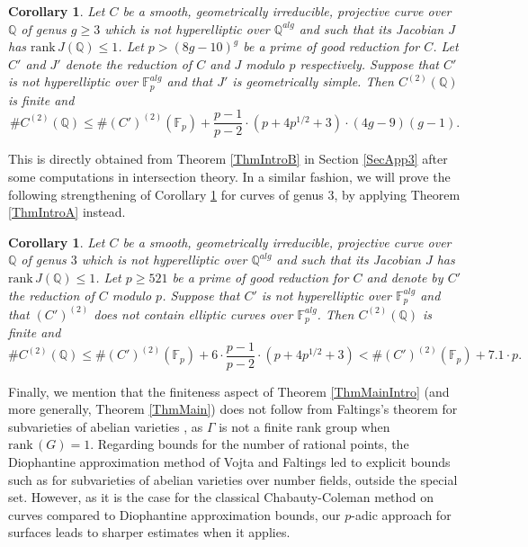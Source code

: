 \documentclass[11pt]{amsart}
\newtheorem{corollary}[theorem]{Corollary}
\theoremstyle{remark}
\numberwithin{equation}{section}
\newcommand{\F}{\mathbb{F}}
\newcommand{\Q}{\mathbb{Q}}
\newcommand{\rk}{\mathrm{rank}\,}
\begin{document}
\begin{corollary}\label{CoroQuadratic} Let $C$ be a smooth, geometrically irreducible, projective curve over $\Q$ of genus $g\ge 3$ which is not hyperelliptic over $\Q^{alg}$ and such that its Jacobian $J$ has $\rk J(\Q)\le 1$.  Let  $p>(8g-10)^g$ be a prime of good reduction for $C$. Let $C'$ and $J'$ denote the reduction of $C$ and $J$ modulo $p$ respectively. Suppose that $C'$ is not hyperelliptic over $\F_p^{alg}$ and that $J'$ is geometrically simple. Then  $C^{(2)}(\Q)$ is finite and
$$
\# C^{(2)}(\Q)\le \# (C')^{(2)}(\F_p) +  \frac{p-1}{p-2}\cdot \left(p+4p^{1/2} + 3\right)\cdot (4g-9)(g-1).
$$
\end{corollary}

This is directly obtained from Theorem \ref{ThmIntroB} in Section \ref{SecApp3} after some computations in intersection theory. In a similar fashion, we will prove the following strengthening of Corollary \ref{CoroQuadratic} for curves of genus $3$, by applying Theorem \ref{ThmIntroA} instead.

\begin{corollary}\label{CoroQuadratic3} Let $C$ be a smooth, geometrically irreducible, projective curve over $\Q$ of genus $3$ which is not hyperelliptic over $\Q^{alg}$ and such that its Jacobian $J$ has $\rk J(\Q)\le 1$.  Let  $p\ge 521$ be a prime of good reduction for $C$ and denote by $C'$ the reduction of $C$ modulo $p$. Suppose that $C'$ is not hyperelliptic over $\F_p^{alg}$ and that $(C')^{(2)}$ does not contain elliptic curves over $\F_p^{alg}$. Then  $C^{(2)}(\Q)$  is finite and
$$
\# C^{(2)}(\Q)\le \# (C')^{(2)}(\F_p) +  6\cdot \frac{p-1}{p-2}\cdot \left(p+4p^{1/2} + 3\right) <  \# (C')^{(2)}(\F_p) + 7.1\cdot p.
$$
\end{corollary}


Finally, we mention that the finiteness aspect of Theorem \ref{ThmMainIntro} (and more generally, Theorem \ref{ThmMain}) does not follow from Faltings's theorem for subvarieties of abelian varieties \cite{Faltings2}, as $\Gamma$ is not a finite rank group when $\rk(G)=1$.  Regarding bounds for the number of rational points, the Diophantine approximation method of Vojta \cite{VojtaCompact} and Faltings \cite{Faltings2, Faltings3} led to explicit bounds such as \cite{Remond1, Remond2} for subvarieties of abelian varieties over number fields, outside the special set. However, as it is the case for the classical Chabauty-Coleman method on curves compared to Diophantine approximation bounds, our $p$-adic approach for surfaces leads to sharper estimates when it applies. 
\end{document}
